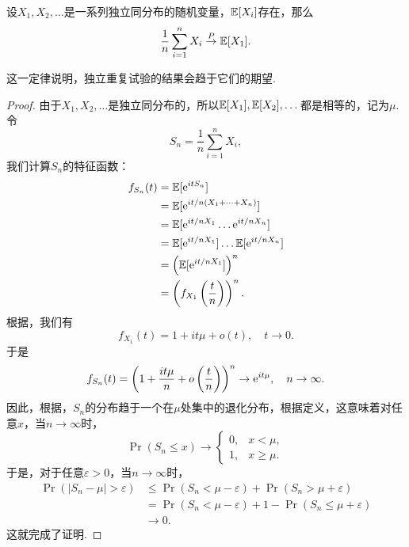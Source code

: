 \begin{theorem}[Khinchin大数定律]\label{theorem:khinchin}
    设$X_1,X_2,\dots$是一系列独立同分布的随机变量，$\mathbb{E}[X_i]$存在，那么
    \[\frac{1}{n}\sum_{i=1}^n X_i\stackrel{P}{\to}\mathbb{E}[X_1].\]
\end{theorem}
这一定律说明，独立重复试验的结果会趋于它们的期望.
\begin{proof}
    由于$X_1,X_2,\dots$是独立同分布的，所以$\mathbb{E}[X_1],\mathbb{E}[X_2],\dots$都是相等的，记为$\mu$. 令
    \[S_n=\frac{1}{n}\sum_{i=1}^n X_i,\]
    我们计算$S_n$的特征函数：
    \begin{align*}
        f_{S_n}(t)&=\mathbb{E}[\mathrm{e}^{itS_n}]\\
        &=\mathbb{E}[\mathrm{e}^{it/n(X_1+\dots+X_n)}]\\
        &=\mathbb{E}[\mathrm{e}^{it/nX_1}\dots\mathrm{e}^{it/nX_n}]\\
        &=\mathbb{E}[\mathrm{e}^{it/nX_1}]\dots\mathbb{E}[\mathrm{e}^{it/nX_n}]\\
        &=\left(\mathbb{E}[\mathrm{e}^{it/nX_1}]\right)^n\\
        &=\left(f_{X_1}\left(\frac{t}{n}\right)\right)^n.
    \end{align*}
    根据，我们有
    \[f_{X_1}(t)=1+it\mu+o(t),\quad t\to 0.\]
    于是
    \[f_{S_n}(t)=\left(1+\frac{it\mu}{n}+o\left(\frac{t}{n}\right)\right)^n\to\mathrm{e}^{it\mu},\quad n\to\infty.\]
    因此，根据，$S_n$的分布趋于一个在$\mu$处集中的退化分布，根据定义，这意味着对任意$x$，当$n\to\infty$时，
    \[\Pr(S_n\leq x)\to\begin{cases}
        0,&x<\mu,\\
        1,&x\geq\mu.
    \end{cases}\]
    于是，对于任意$\varepsilon>0$，当$n\to\infty$时，
    \begin{align*}
        \Pr(|S_n-\mu|>\varepsilon)&\leq \Pr(S_n<\mu-\varepsilon)+\Pr(S_n>\mu+\varepsilon)\\
        &=\Pr(S_n<\mu-\varepsilon)+1-\Pr(S_n\leq\mu+\varepsilon)\\
        &\to 0.
    \end{align*}
    这就完成了证明. 
\end{proof}
